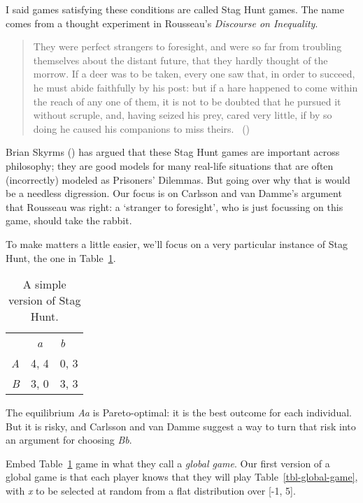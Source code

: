 \documentclass[
  10pt,
  letterpaper,
  twoside]{scrbook}
\begin{document}
I said games satisfying these conditions are called Stag Hunt games. The
name comes from a thought experiment in Rousseau's \emph{Discourse on
Inequality}.

\begin{quote}
They were perfect strangers to foresight, and were so far from troubling
themselves about the distant future, that they hardly thought of the
morrow. If a deer was to be taken, every one saw that, in order to
succeed, he must abide faithfully by his post: but if a hare happened to
come within the reach of any one of them, it is not to be doubted that
he pursued it without scruple, and, having seized his prey, cared very
little, if by so doing he caused his companions to miss theirs.
~()
\end{quote}

Brian Skyrms () has argued that these
Stag Hunt games are important across philosophy; they are good models
for many real-life situations that are often (incorrectly) modeled as
Prisoners' Dilemmas. But going over why that is would be a needless
digression. Our focus is on Carlsson and van Damme's argument that
Rousseau was right: a `stranger to foresight', who is just focussing on
this game, should take the rabbit.

To make matters a little easier, we'll focus on a very particular
instance of Stag Hunt, the one in Table~\ref{tbl-stag-hunt}.

\begin{longtable}[]{@{}rcl@{}}
\caption{A simple version of Stag
Hunt.}\label{tbl-stag-hunt}\tabularnewline
\toprule\noalign{}
\endfirsthead
\endhead
\bottomrule\noalign{}
\endlastfoot
& \emph{a} & \emph{b} \\
\emph{A} & 4, 4 & 0, 3 \\
\emph{B} & 3, 0 & 3, 3 \\
\end{longtable}

The equilibrium \emph{Aa} is Pareto-optimal: it is the best outcome for
each individual. But it is risky, and Carlsson and van Damme suggest a
way to turn that risk into an argument for choosing \emph{Bb}.

Embed Table~\ref{tbl-stag-hunt} game in what they call a \emph{global
game}. Our first version of a global game is that each player knows that
they will play Table~\ref{tbl-global-game}, with \emph{x} to be selected
at random from a flat distribution over {[}-1, 5{]}.
\end{document}
